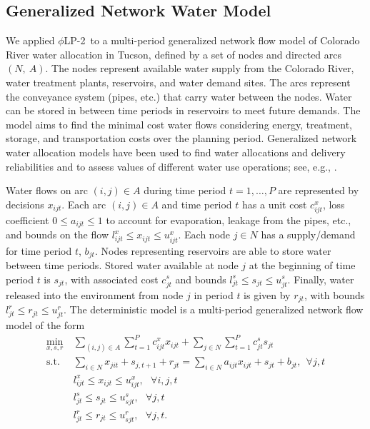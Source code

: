 \documentclass[opre,nonblindrev]{informs3} %
\newcommand{\st}{\mbox{s.t.}}
\newcommand{\plp}{$\phi$LP-2}
\begin{document}
\subsection{Generalized Network Water Model} 
\label{ssec:network_model}

We applied \plp\ to a multi-period generalized network flow model of Colorado River water allocation in Tucson, defined by a set of nodes and directed arcs $(N,\: A)$.
The nodes represent available water supply from the Colorado River, water treatment plants, reservoirs, and water demand sites.
The arcs represent the conveyance system (pipes, etc.) that carry water between the nodes. 
Water can be stored in between time periods in reservoirs to meet future demands. 
The model aims to find the minimal cost water flows considering energy, treatment, storage, and transportation costs over the planning period. 
Generalized network water allocation models have been used to find water allocations and delivery reliabilities and to assess values of different water use operations; see, e.g., \cite{draper_etal_03}. 

Water flows on arc $(i,j) \in A$ during time period $t = 1, \dots, P$ are represented by decisions $x_{ijt}$.
Each arc $(i,j) \in A$ and time period $t$ has a unit cost $c_{ijt}^x$, loss coefficient $0 \leq a_{ijt} \leq 1$ to account for evaporation, leakage from the pipes, etc., and bounds on the flow $l_{ijt}^x \leq x_{ijt} \leq u_{ijt}^x$.
Each node $j \in N$ has a supply/demand for time period $t$, $b_{jt}$.
Nodes representing reservoirs are able to store water between time periods.
Stored water available at node $j$ at the beginning of time period $t$ is $s_{jt}$, with associated cost $c_{jt}^s$ and bounds $l_{jt}^s \leq s_{jt} \leq u_{jt}^s$.
Finally, water released into the environment from node $j$ in period $t$ is given by $r_{jt}$, with bounds $l_{jt}^r \leq r_{jt} \leq u_{jt}^r$.
The deterministic model is a multi-period generalized network flow model of the form
\begin{align*}
	\min_{x,s,r} \ & \sum_{(i,j) \in A} \sum_{t=1}^P c_{ijt}^x x_{ijt} + \sum_{j \in N} \sum_{t=1}^P c_{jt}^s s_{jt}\\
	\st \ & \sum_{i \in N} x_{jit} + s_{j,t+1} + r_{jt} = \sum_{i \in N} a_{ijt} x_{ijt} + s_{jt} + b_{jt}, \ \ \forall j,t \\
	& l_{ijt}^x \leq x_{ijt} \leq u_{ijt}^x,\ \ \ \forall i,j,t \\
	& l_{jt}^s \leq s_{jt} \leq u_{sjt}^s, \ \ \ \forall j,t \\
	& l_{jt}^r \leq r_{jt} \leq u_{sjt}^r, \ \ \ \forall j,t.
\end{align*}
\end{document}

